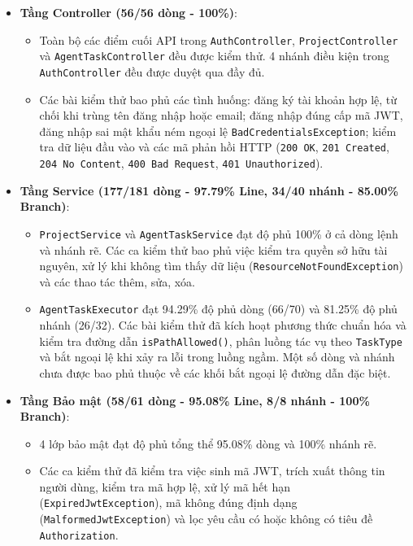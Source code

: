 \documentclass[12pt,a4paper]{report}
\begin{document}
\begin{itemize}
    \item \textbf{Tầng Controller (56/56 dòng - 100\%)}:
    \begin{itemize}
        \item Toàn bộ các điểm cuối API trong \texttt{AuthController}, \texttt{ProjectController} và \texttt{AgentTaskController} đều được kiểm thử. 4 nhánh điều kiện trong \texttt{AuthController} đều được duyệt qua đầy đủ.
        \item Các bài kiểm thử bao phủ các tình huống: đăng ký tài khoản hợp lệ, từ chối khi trùng tên đăng nhập hoặc email; đăng nhập đúng cấp mã JWT, đăng nhập sai mật khẩu ném ngoại lệ \texttt{BadCredentialsException}; kiểm tra dữ liệu đầu vào và các mã phản hồi HTTP (\texttt{200 OK}, \texttt{201 Created}, \texttt{204 No Content}, \texttt{400 Bad Request}, \texttt{401 Unauthorized}).
    \end{itemize}

    \item \textbf{Tầng Service (177/181 dòng - 97.79\% Line, 34/40 nhánh - 85.00\% Branch)}:
    \begin{itemize}
        \item \texttt{ProjectService} và \texttt{AgentTaskService} đạt độ phủ 100\% ở cả dòng lệnh và nhánh rẽ. Các ca kiểm thử bao phủ việc kiểm tra quyền sở hữu tài nguyên, xử lý khi không tìm thấy dữ liệu (\texttt{ResourceNotFoundException}) và các thao tác thêm, sửa, xóa.
        \item \texttt{AgentTaskExecutor} đạt 94.29\% độ phủ dòng (66/70) và 81.25\% độ phủ nhánh (26/32). Các bài kiểm thử đã kích hoạt phương thức chuẩn hóa và kiểm tra đường dẫn \texttt{isPathAllowed()}, phân luồng tác vụ theo \texttt{TaskType} và bắt ngoại lệ khi xảy ra lỗi trong luồng ngầm. Một số dòng và nhánh chưa được bao phủ thuộc về các khối bắt ngoại lệ đường dẫn đặc biệt.
    \end{itemize}

    \item \textbf{Tầng Bảo mật (58/61 dòng - 95.08\% Line, 8/8 nhánh - 100\% Branch)}:
    \begin{itemize}
        \item 4 lớp bảo mật đạt độ phủ tổng thể 95.08\% dòng và 100\% nhánh rẽ.
        \item Các ca kiểm thử đã kiểm tra việc sinh mã JWT, trích xuất thông tin người dùng, kiểm tra mã hợp lệ, xử lý mã hết hạn (\texttt{ExpiredJwtException}), mã không đúng định dạng (\texttt{MalformedJwtException}) và lọc yêu cầu có hoặc không có tiêu đề \texttt{Authorization}.
    \end{itemize}


\end{itemize}
\end{document}
